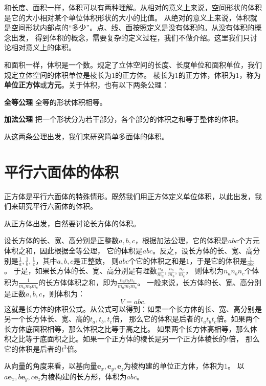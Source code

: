 \documentclass[12pt,UTF8,fontset=none]{ctexbook}
\begin{document}
和长度、面积一样，体积可以有两种理解。从相对的意义上来说，空间形状的体积是它的大小相对某个单位体积形状的大小的比值。
从绝对的意义上来说，体积就是空间形状内部点的“多少”。点、线、面按照定义是没有体积的。从没有体积的概念出发，
得到体积的概念，需要复杂的定义过程，我们不做介绍。这里我们只讨论相对意义上的体积。

和面积一样，体积是一个数。规定了立体空间的长度、长度单位和面积单位，我们规定立体空间的体积单位是棱长为$1$的正方体。
棱长为$1$的正方体，体积为$1$，称为\textbf{单位正方体}或\textbf{方元}。关于体积，也有以下两条公理：
\begin{po}{\textbf{全等公理}}\label{po:4}
    全等的形状体积相等。
\end{po}
\begin{po}{\textbf{加法公理}}\label{po:5}
    把一个形状分为若干部分，各个部分的体积之和等于整体的体积。
\end{po}
从这两条公理出发，我们来研究简单多面体的体积。

\section{平行六面体的体积}

正方体是平行六面体的特殊情形。既然我们用正方体定义单位体积，以此出发，我们来研究平行六面体的体积。

从正方体出发，自然要讨论长方体的体积。

设长方体的长、宽、高分别是正整数$a,b,c$，根据加法公理，它的体积是$abc$个方元体积之和，因此根据全等公理，
它的体积是$abc$。反之，设长方体的长、宽、高分别是$\frac{1}{a},\frac{1}{b},\frac{1}{c}$，其中$a,b,c$是正整数，
则$abc$个它的体积之和是$1$，于是它的体积是$\frac{1}{abc}$。
于是，如果长方体的长、宽、高分别是有理数$\frac{n_a}{m_a},\frac{n_b}{m_b},\frac{n_c}{m_c}$，
则体积为$n_an_bn_c$个体积为$\frac{1}{m_am_bm_c}$的长方体体积之和，即为$\frac{n_an_bn_c}{m_am_bm_c}$。
一般来说，长方体的长、宽、高分别是正数$a,b,c$，则体积为：
$$ V = abc.$$
这就是长方体的体积公式。从公式可以得到：如果一个长方体的长、宽、高分别是另一个长方体长、宽、高的$t_a,t_b,t_c$倍，
那么它的体积是后者的$t_at_bt_c$倍。如果两个长方体底面积相等，那么体积之比等于高之比。
如果两个长方体高相等，那么体积之比等于底面积之比。如果一个正方体的棱长是另一个正方体棱长的$t$倍，
那么它的体积是后者的$t^3$倍。

从向量的角度来看，以基向量$\mathbf{e}_x, \mathbf{e}_y, \mathbf{e}_z$为棱构建的单位正方体，体积为$1$。
以$a\mathbf{e}_x, b\mathbf{e}_y, c\mathbf{e}_z$为棱构建的长方形，体积为$abc$。
\end{document}
